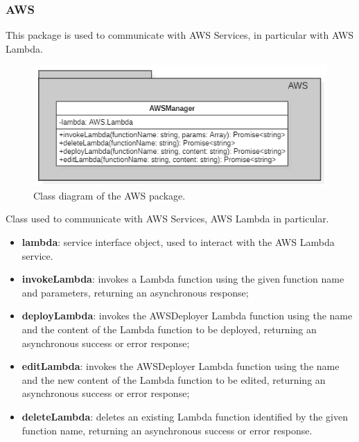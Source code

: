 	\subsubsection{AWS}
	This package is used to communicate with AWS Services, in particular with AWS Lambda.
	\begin{figure} [h!]
		\centering
		\includegraphics[width=0.8\linewidth]{diagrammi/etherless-server/AWS}
		\caption{Class diagram of the AWS package.}
	\end{figure}
	Class used to communicate with AWS Services, AWS Lambda in particular.
	\begin{itemize}
		\item \textbf{lambda}: service interface object, used to interact with the AWS Lambda service.
	\end{itemize}
	\begin{itemize}
		\item \textbf{invokeLambda}: invokes a Lambda function using the given function name and parameters, returning an asynchronous response;
		\item \textbf{deployLambda}: invokes the AWSDeployer Lambda function using the name and the content of the Lambda function to be deployed, returning an asynchronous success or error response;
		\item \textbf{editLambda}: invokes the AWSDeployer Lambda function using the name and the new content of the Lambda function to be edited, returning an asynchronous success or error response;
		\item \textbf{deleteLambda}: deletes an existing Lambda function identified by the given function name, returning an asynchronous success or error response.
	\end{itemize}
